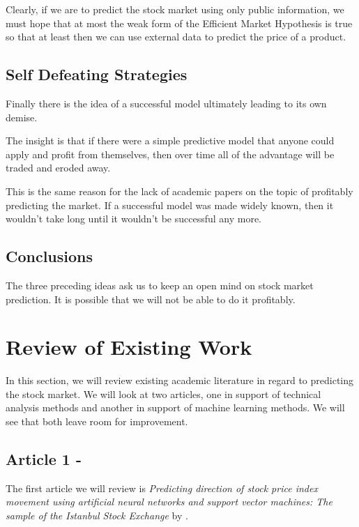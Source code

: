 \documentclass{report}
\begin{document}
Clearly, if we are to predict the stock market using only public information, we must hope that at most the weak form of the Efficient Market Hypothesis is true so that at least then we can use external data to predict the price of a product.

\section{Self Defeating Strategies}

Finally there is the idea of a successful model ultimately leading to its own demise. 

The insight is that if there were a simple predictive model that anyone could apply and profit from themselves, then over time all of the advantage will be traded and eroded away.

This is the same reason for the lack of academic papers on the topic of profitably predicting the market. If a successful model was made widely known, then it wouldn't take long until it wouldn't be successful any more.

\section{Conclusions}

The three preceding ideas ask us to keep an open mind on stock market prediction. It is possible that we will not be able to do it profitably.

\chapter{Review of Existing Work}

In this section, we will review existing academic literature in regard to predicting the stock market. We will look at two articles, one in support of technical analysis methods and another in support of machine learning methods. We will see that both leave room for improvement.

\section{Article 1 - \citet{kara2011predicting}} 

The first article we will review is \textit{Predicting direction of stock price index movement using artificial neural networks and support vector machines: The sample of the Istanbul Stock Exchange} by \citet{kara2011predicting}. 
\end{document}
